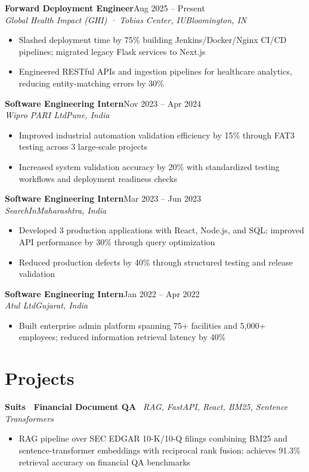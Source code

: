 \documentclass[10pt,letterpaper]{article}
\newcommand{\expentry}[4]{%
  \vspace{1pt}\noindent
  \textbf{#1}\hfill{\small #2}\\[-3pt]
  \textit{\small #3}\hfill{\textit{\small #4}}%
  \vspace{-4pt}
}
\newcommand{\projentry}[2]{%
  \vspace{1pt}\noindent
  \textbf{#1} \textemdash\ \textit{\small #2}%
  \vspace{-2pt}
}
\newenvironment{bullets}{%
  \begin{itemize}[leftmargin=1.3em, itemsep=0pt, topsep=3pt, parsep=0pt, partopsep=0pt]\small
}{%
  \end{itemize}\vspace{1pt}
}
\begin{document}
\expentry{Forward Deployment Engineer}{Aug 2025 -- Present}%
  {Global Health Impact (GHI) · Tobias Center, IU}{Bloomington, IN}
\begin{bullets}
  \item Slashed deployment time by 75\% building Jenkins/Docker/Nginx CI/CD pipelines; migrated legacy Flask services to Next.js
  \item Engineered RESTful APIs and ingestion pipelines for healthcare analytics, reducing entity-matching errors by 30\%
\end{bullets}

\expentry{Software Engineering Intern}{Nov 2023 -- Apr 2024}{Wipro PARI Ltd}{Pune, India}
\begin{bullets}
  \item Improved industrial automation validation efficiency by 15\% through FAT3 testing across 3 large-scale projects
  \item Increased system validation accuracy by 20\% with standardized testing workflows and deployment readiness checks
\end{bullets}

\expentry{Software Engineering Intern}{Mar 2023 -- Jun 2023}{SearchIn}{Maharashtra, India}
\begin{bullets}
  \item Developed 3 production applications with React, Node.js, and SQL; improved API performance by 30\% through query optimization
  \item Reduced production defects by 40\% through structured testing and release validation
\end{bullets}

\expentry{Software Engineering Intern}{Jan 2022 -- Apr 2022}{Atul Ltd}{Gujarat, India}
\begin{bullets}
  \item Built enterprise admin platform spanning 75+ facilities and 5,000+ employees; reduced information retrieval latency by 40\%
\end{bullets}

\section{Projects}

\projentry{Suits \textemdash\ Financial Document QA}{RAG, FastAPI, React, BM25, Sentence Transformers}
\begin{bullets}
  \item RAG pipeline over SEC EDGAR 10-K/10-Q filings combining BM25 and sentence-transformer embeddings with reciprocal rank fusion; achieves 91.3\% retrieval accuracy on financial QA benchmarks
\end{bullets}
\end{document}
